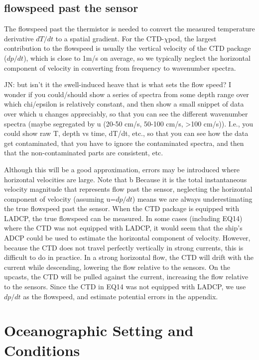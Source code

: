 \documentclass{ametsoc}
\begin{document}



\subsection{flowspeed past the sensor}

The flowspeed past the thermistor is needed to convert the measured temperature derivative $dT/dt$ to a spatial gradient. For the CTD-$\chi$pod, the largest contribution to the flowspeed is usually the vertical velocity of the CTD package ($dp/dt$), which is close to 1m/s on average, so we typically neglect the horizontal component of velocity in converting from frequency to wavenumber spectra.    

JN: but isn't it the swell-induced heave that is what sets the flow speed?  I wonder if you could/should show a series of spectra from some depth range over which chi/epsilon is relatively constant, and then show a small snippet of data  over which u changes appreciably, so that you can see the different wavenumber spectra (maybe segregated by u (20-50 cm/s, 50-100 cm/s, >100 cm/s)).  I.e., you could show raw T, depth vs time, dT/dt, etc., so that you can see how the data get contaminated, that you have to ignore the contaminated spectra, and then that the non-contaminated parts are consistent, etc.  


Although this will be a good approximation, errors may be introduced where horizontal velocities are large. Note that b
Because it is the total instantaneous velocity magnitude that represents flow past the sensor, neglecting the horizontal component of velocity (assuming u=$dp/dt$) means we are always underestimating the true flowspeed past the sensor. When the CTD package is equipped with LADCP, the true flowspeed can be measured. In some cases (including EQ14) where the CTD was not equipped with LADCP, it would seem that the ship's ADCP could be used to estimate the horizontal component of velocity. However, because the CTD does not travel perfectly vertically in strong currents, this is difficult to do in practice. In a strong horizontal flow, the CTD will drift with the current while descending, lowering the flow relative to the sensors. On the upcasts, the CTD will be pulled against the current, increasing the flow relative to the sensors. Since the CTD in EQ14 was not equipped with LADCP, we use $dp/dt$ as the flowspeed, and estimate potential errors in the appendix.

\section{Oceanographic Setting and Conditions}
\end{document}
